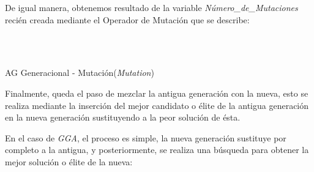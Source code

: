 \documentclass[a4paper, 11pt]{article}
\begin{document}
			De igual manera, obtenemos resultado de la variable \textit{Número\_de\_Mutaciones} recién
			creada mediante el Operador de Mutación que se describe:
			
			\begin{algorithm}[H]
				\begin{algorithmic}[1]
				\REQUIRE \ \\
						 \
						
					\ENDIF
				\ENDFOR
					
						
						\ENDIF
						
					\ENDIF
				\ENDWHILE
				\end{algorithmic}
			\caption{AG Generacional - Mutación(\textit{Mutation})}
			\label{GGA-Mut}
			\end{algorithm}
			
			Finalmente, queda el paso de mezclar la antigua generación con la nueva, esto se realiza
			mediante la inserción del mejor candidato o élite de la antigua generación en la nueva
			generación sustituyendo a la peor solución de ésta.
			
			En el caso de \textit{GGA}, el proceso es simple, la nueva generación sustituye por completo
			a la antigua, y posteriormente, se realiza una búsqueda para obtener la mejor solución o
			élite de la nueva:
			
\end{document}
